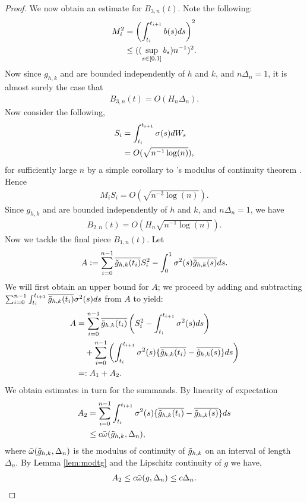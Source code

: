 \begin{proof}
We now obtain an estimate for  $B_{3,n}(t)$. Note the following:
\begin{align}
  M_i^2 & = \left(\int_{t_i}^{t_{i+1}} b(s) d s\right)^2 \notag\\
  & \le ( (\sup_{s \in [0,1]} b_s) n^{-1})^2. 
  \label{eq:m}
\end{align}
 Now since  $g_{h,k}$ and \tghk  are bounded independently of $h$ and $k$, and $n\Delta_n = 1$, it is almost surely the case that 
\begin{align}
  B_{3,n}(t) = O( H_n \Delta_n).
  \label{}
\end{align}
  Now consider the following, 
\begin{align}
  S_i & = \int_{t_i}^{t_{i+1}} \sigma(s) d W_s\notag \\
  & = O (\sqrt{n^{-1} \log(n)}),\label{eq:rthree}
\end{align}
for sufficiently large $n$ by a simple corollary to \levy's modulus of continuity theorem \citep[Theorem 10.32]{Rogers1994a}. Hence
\begin{align}
  M_i S_i = O(\sqrt{n^{-3} \log(n)}).\label{eq:ms}
\end{align}
Since  $g_{h,k}$ and \tghk  are bounded independently of $h$ and $k$, and $n\Delta_n = 1$, we have
\begin{align}
  B_{2,n}(t) = O( H_n \sqrt{n^{-1} \log(n)}).
  \label{}
\end{align}
Now we tackle the final piece $B_{1,n}(t)$. Let 
\begin{align}
  A  := \sum_{i=0}^{n-1}\overline{\tilde{g}_{h,k}(t_i)} S_i^2 -\int_{0}^{1} \sigma^2(s) \overline{\tilde{g}_{h,k}(s)} d s.
\end{align}
We will first obtain an upper bound for $A$; we proceed by adding and subtracting $\sum_{i = 0}^{n-1}\int_{t_i}^{t_{i+1}}\overline{\tilde{g}_{h,k}(t_i)} \sigma^2(s)  d s$  from  $A$ to yield: 
\begin{align}
  A & = \sum_{i = 0}^{n-1}\overline{\tilde{g}_{h,k}(t_i)} \left(S_i^2 -\int_{t_i}^{t_{i+1}} \sigma^2(s) d s\right)\notag \\
  &\quad +  \sum_{i = 0}^{n-1}\left(\int_{t_i}^{t_{i+1}} \sigma^2(s) \{\overline{\tilde{g}_{h,k}(t_i)} - \overline{\tilde{g}_{h,k}(s)}\} d s\right) \notag\\
  &=:A_{1} + A_{2} \notag.
  \label{}
\end{align}
We obtain estimates in turn for the summands. By linearity of expectation 
\begin{align}
  A_{2} &= \sum_{i = 0}^{n-1} \int_{t_i}^{t_{i+1}} \sigma^2(s)  \{\overline{\tilde{g}_{h,k}(t_i)} - \overline{\tilde{g}_{h,k}(s)}\} d s\notag\\
  &\le c{\bar{\omega}}({\tilde{g}_{h,k}},\Delta_n),\notag
  \label{}
\end{align}
where ${\bar{\omega}}({\tilde{g}_{h,k}},\Delta_n)$ is the modulus of continuity of $\tilde{g}_{h,k}$ on an interval of length $\Delta_n$. By  Lemma \eqref{lem:modtg} and the Lipschitz continuity of $g$ we have, 
\begin{align}
  A_{2} \le c{\bar{\omega}}({g},\Delta_n) \le c \Delta_n.\notag 
  \label{}
\end{align}


\end{proof}
